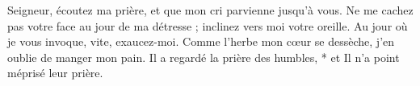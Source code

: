 Seigneur, écoutez ma prière, et que mon cri parvienne jusqu’à vous.
\versseparator
Ne me cachez pas votre face au jour de ma détresse ; inclinez vers moi votre oreille.
\versseparator
Au jour où je vous invoque, vite, exaucez-moi.
\versseparator
Comme l’herbe mon cœur se dessèche, j’en oublie de manger mon pain.
\versseparator
Il a regardé la prière des humbles, * et Il n'a point méprisé leur prière.